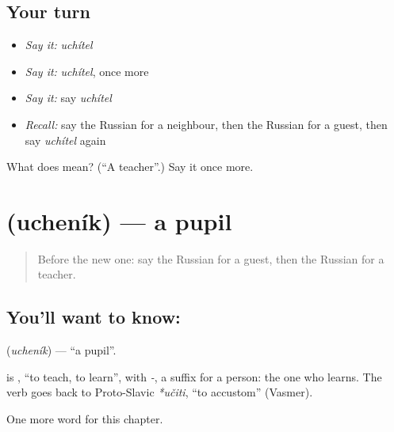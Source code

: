 \subsection*{Your turn}
\begin{itemize}
\raggedright
  \item \emph{Say it:} \emph{uchítel}
  \item \emph{Say it:} \emph{uchítel}, once more
  \item \emph{Say it:} say \emph{uchítel}
  \item \emph{Recall:} say the Russian for a neighbour, then the Russian for a guest, then say \emph{uchítel} again
\end{itemize}

\begin{tcolorbox}[breakable,colback=teal!4,colframe=teal!35!black,title={Before you move on}]
What does  mean? (\textquotedblleft{}A teacher\textquotedblright{}.) Say it once more.
\end{tcolorbox}
\section[\texorpdfstring{\ru{ученик} (ucheník)}{ученик (ucheník)}]{ (ucheník) — a pupil}

\label{lesson:RU-C37-pupil}



\begin{quote}
Before the new one: say the Russian for a guest, then the Russian for a teacher.
\end{quote}

\subsection*{You'll want to know: }
\textbf{} (\emph{ucheník}) — \textquotedblleft{}a pupil\textquotedblright{}.

\begin{cousinweb}
\textbf{} is \emph{}, \textquotedblleft{}to teach, to learn\textquotedblright{}, with \emph{-}, a suffix for a person: the one who learns. The verb goes back to Proto-Slavic \emph{*učiti}, \textquotedblleft{}to accustom\textquotedblright{} (Vasmer).
\end{cousinweb}

\begin{grammarlens}[title={What you've built}]
One more word for this chapter.
\end{grammarlens}

